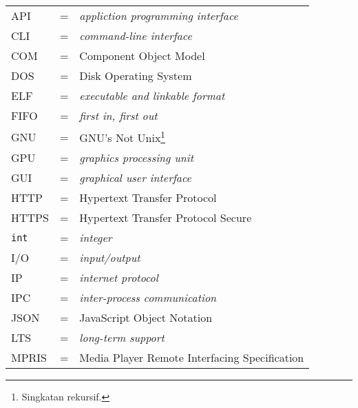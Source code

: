 \begin{longtable}{llp{3in}}
    API & \hspace{1.5cm} = & \textit{appliction programming interface}\\
    CLI & \hspace{1.5cm} = & \textit{command-line interface}\\
    COM & \hspace{1.5cm} = & Component Object Model\\
    DOS & \hspace{1.5cm} = & Disk Operating System\\
    ELF & \hspace{1.5cm} = & \textit{executable and linkable format}\\
    FIFO & \hspace{1.5cm} = & \textit{first in, first out}\\
    GNU & \hspace{1.5cm} = & GNU's Not Unix\footnote{Singkatan rekursif.}\\
    GPU & \hspace{1.5cm} = & \textit{graphics processing unit}\\
    GUI & \hspace{1.5cm} = & \textit{graphical user interface}\\
    HTTP & \hspace{1.5cm} = & Hypertext Transfer Protocol\\
    HTTPS & \hspace{1.5cm} = & Hypertext Transfer Protocol Secure\\
    \verb|int| & \hspace{1.5cm} = & \textit{integer}\\
    I/O & \hspace{1.5cm} = & \textit{input/output}\\
    IP & \hspace{1.5cm} = & \textit{internet protocol}\\
    IPC & \hspace{1.5cm} = & \textit{inter-process communication}\\
    JSON & \hspace{1.5cm} = & JavaScript Object Notation\\
    LTS & \hspace{1.5cm} = & \textit{long-term support}\\
    MPRIS & \hspace{1.5cm} = & Media Player Remote Interfacing Specification\\

\end{longtable}
